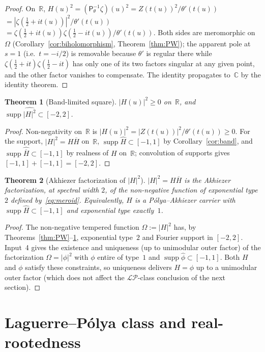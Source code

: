 \documentclass[11pt,a4paper]{article}
\newtheorem{theorem}{Theorem}[section]
\theoremstyle{definition}
\DeclareMathOperator{\supp}{supp}
\newcommand{\ipp}{\mathsf{P}_\theta^{-1}}
\newcommand{\C}{\mathbb{C}}
\newcommand{\R}{\mathbb{R}}
\newcommand{\LP}{\mathcal{LP}}
\begin{document}
\begin{proof}
On~$\R$,
$H(u)^2 = (\ipp\zeta)(u)^2 = Z(t(u))^2/\theta'(t(u))$
$= |\zeta(\tfrac12+it(u))|^2/\theta'(t(u))$
$= \zeta(\tfrac12+it(u))\zeta(\tfrac12-it(u))/\theta'(t(u))$.
Both sides are meromorphic on~$\Omega$ (Corollary~\ref{cor:biholomorphism},
Theorem~\ref{thm:PW}); the apparent pole at $s=1$ (i.e.\ $t=-i/2$) is removable
because $\theta'$ is regular there while $\zeta(\tfrac12+it)\zeta(\tfrac12-it)$ has
only one of its two factors singular at any given point, and the other factor
vanishes to compensate. The identity propagates to~$\C$ by the identity theorem.
\end{proof}

\begin{theorem}[Band-limited square]\label{thm:sq}
$|H(u)|^2 \ge 0$ on~$\R$, and $\supp\widehat{|H|^2}\subset[-2,2]$.
\end{theorem}

\begin{proof}
Non-negativity on~$\R$ is $|H(u)|^2 = |Z(t(u))|^2/\theta'(t(u)) \ge 0$. For the
support, $|H|^2 = H\overline H$ on~$\R$, $\supp\widehat H\subset[-1,1]$ by
Corollary~\ref{cor:band}, and $\supp\widehat{\overline H}\subset[-1,1]$ by realness
of $H$ on~$\R$; convolution of supports gives $[-1,1]+[-1,1]=[-2,2]$.
\end{proof}

\begin{theorem}[Akhiezer factorization of $|H|^2$]\label{thm:akhiezer}
$|H|^2 = H\overline H$ is the Akhiezer factorization, at spectral width $2$, of the
non-negative function of exponential type $2$ defined by~\eqref{eq:meroid}.
Equivalently, $H$ is a P\'olya--Akhiezer carrier with
$\supp\widehat H\subset[-1,1]$ and exponential type exactly~$1$.
\end{theorem}

\begin{proof}
The non-negative tempered function $\Omega := |H|^2$ has, by
Theorems~\ref{thm:PW}--\ref{thm:sq}, exponential type~$2$ and Fourier support in
$[-2,2]$. Input~4 gives the existence and uniqueness (up to unimodular outer
factor) of the factorization $\Omega = |\phi|^2$ with $\phi$ entire of type~$1$
and $\supp\widehat\phi\subset[-1,1]$. Both $H$ and $\phi$ satisfy these
constraints, so uniqueness delivers $H = \phi$ up to a unimodular outer factor
(which does not affect the $\LP$-class conclusion of the next section).
\end{proof}

\section{Laguerre--P\'olya class and real-rootedness}
\label{sec:LP}
\end{document}
